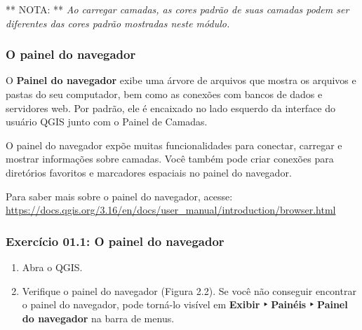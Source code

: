 \documentclass[
]{book}
\providecommand{\tightlist}{%
  \setlength{\itemsep}{0pt}\setlength{\parskip}{0pt}}
\begin{document}
** NOTA: ** \emph{Ao carregar camadas, as cores padrão de suas camadas podem ser diferentes das cores padrão mostradas neste módulo.}

\hypertarget{o-painel-do-navegador}{%
\subsubsection{\texorpdfstring{\textbf{O painel do navegador}}{O painel do navegador}}\label{o-painel-do-navegador}}

O \textbf{Painel do navegador} exibe uma árvore de arquivos que mostra os arquivos e pastas do seu computador, bem como as conexões com bancos de dados e servidores web. Por padrão, ele é encaixado no lado esquerdo da interface do usuário QGIS junto com o Painel de Camadas.

O painel do navegador expõe muitas funcionalidades para conectar, carregar e mostrar informações sobre camadas. Você também pode criar conexões para diretórios favoritos e marcadores espaciais no painel do navegador.

Para saber mais sobre o painel do navegador, acesse: \href{https://docs.qgis.org/3.16/en\%20/docs/user_manual/introduction/browser.html}{https://docs.qgis.org/3.16/en/docs/user\_manual/introduction/browser.html}

\hypertarget{exercuxedcio-01.1-o-painel-do-navegador}{%
\subsubsection{\texorpdfstring{\textbf{Exercício 01.1: O painel do navegador}}{Exercício 01.1: O painel do navegador}}\label{exercuxedcio-01.1-o-painel-do-navegador}}

\begin{enumerate}
\def\labelenumi{\arabic{enumi}.}
\tightlist
\item
  Abra o QGIS.
\item
  Verifique o painel do navegador (Figura 2.2). Se você não conseguir encontrar o painel do navegador, pode torná-lo visível em \textbf{Exibir ‣ Painéis ‣ Painel do navegador} na barra de menus.
\end{enumerate}
\end{document}
